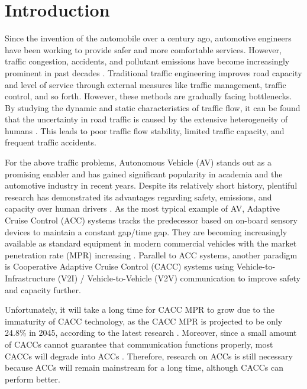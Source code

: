 \documentclass[a4paper]{cas-sc}
\begin{document}
\maketitle

\section{Introduction}
\label{Section 1}
Since the invention of the automobile over a century ago, automotive engineers have been working to provide safer and more comfortable services. However, traffic congestion, accidents, and pollutant emissions have become increasingly prominent in past decades \citep{Schrank2012,Jin2016}. Traditional traffic engineering improves road capacity and level of service through external measures like traffic management, traffic control, and so forth. However, these methods are gradually facing bottlenecks. By studying the dynamic and static characteristics of traffic flow, it can be found that the uncertainty in road traffic is caused by the extensive heterogeneity of humans \citep{Zhong2020,Ye2018,Arem2016,Yu2021}. This leads to poor traffic flow stability, limited traffic capacity, and frequent traffic accidents.

For the above traffic problems, Autonomous Vehicle (AV) stands out as a promising enabler and has gained significant popularity in academia and the automotive industry in recent years. Despite its relatively short history, plentiful research has demonstrated its advantages regarding safety, emissions, and capacity over human drivers \citep{Wang2019,Sarker2019,Dey2015}. As the most typical example of AV, Adaptive Cruise Control (ACC) systems tracks the predecessor based on on-board sensory devices to maintain a constant gap/time gap. They are becoming increasingly available as standard equipment in modern commercial vehicles with the market penetration rate (MPR) increasing \citep{Wilson2011}. Parallel to ACC systems, another paradigm is Cooperative Adaptive Cruise Control (CACC) systems using Vehicle-to-Infrastructure (V2I) / Vehicle-to-Vehicle (V2V) communication to improve safety and capacity further.

Unfortunately, it will take a long time for CACC MPR to grow due to the immaturity of CACC technology, as the CACC MPR is projected to be only 24.8\% in 2045, according to the latest research \citep{Bansal2017}. Moreover, since a small amount of CACCs cannot guarantee that communication functions properly, most CACCs will degrade into ACCs \citep{Wang2018,Ruan2021,Zhou2021}. Therefore, research on ACCs is still necessary because ACCs will remain mainstream for a long time, although CACCs can perform better.
\end{document}
